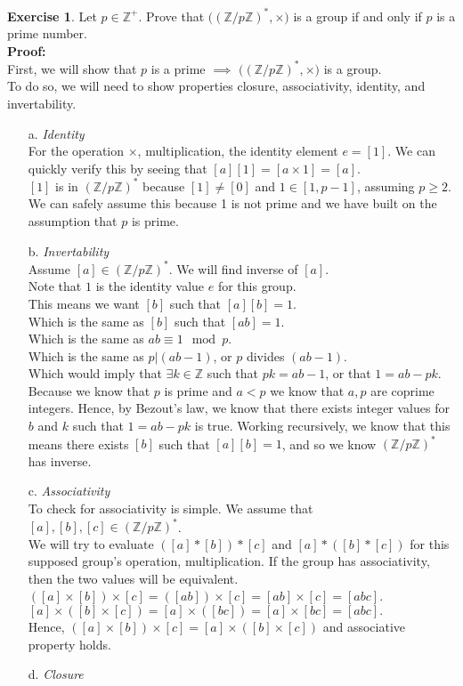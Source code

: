 \documentclass[12pt]{article}
\providecommand{\x}{\times}
\theoremstyle{definition}
\newtheorem{exercise}[theorem]{Exercise}
\newcommand{\Z}{\mathbb{Z}}
\newcommand{\V}{\vspace{0.3cm}\\}
\newcommand{\pro}{\V \textbf{Proof:} \V}
\begin{document}
\begin{exercise} Let $p \in \Z^+.$ Prove that $\big((\Z/p\Z)^*, \x \big)$ is a group if and only if $p$ is a prime number. 
\pro First, we will show that $p$ is a prime $\implies$ $\big((\Z/p\Z)^*, \x \big)$ is a group. \\
To do so, we will need to show properties closure, associativity, identity, and invertability. 
\begin{enumerate}
\item [a.] \textit{Identity} \\
For the operation $\x$, multiplication, the identity element $e = [1]$. We can quickly verify this by seeing that $[a][1] = [a \x 1] = [a]$. \V
$[1]$ is in $(\Z/p\Z)^*$ because $[1] \neq [0]$ and $1 \in [1, p-1]$, assuming $p \geq 2$. We can safely assume this because 1 is not prime and we have built on the assumption that $p$ is prime.  
\item[b. ] \textit{Invertability} \\
Assume $[a] \in (\Z/p\Z)^*$. We will find inverse of $[a]$. \V
Note that $1$ is the identity value $e$ for this group.\\
This means we want $[b]$ such that $[a][b] = 1$.\\
Which is the same as $[b]$ such that $[ab] = 1$.\\
Which is the same as $ab \equiv 1 \mod{p}$.\\
Which is the same as $p | (ab-1)$, or $p$ divides $(ab-1)$. \\
Which would imply that $\exists k\in \Z$ such that $pk = ab-1$, or that $1 = ab - pk$.\V
Because we know that $p$ is prime and $a<p$ we know that $a,p$ are coprime integers. Hence, by Bezout's law, we know that there exists integer values for $b$ and $k$ such that $1 = ab - pk$ is true. Working recursively, we know that this means there exists $[b]$ such that $[a][b] = 1$, and so we know $(\Z/p\Z)^*$ has inverse. 
\item[c.] \textit{Associativity} \\ 
To check for associativity is simple. We assume that $[a],[b],[c] \in (\Z/p\Z)^*$. \\
We will try to evaluate $([a]*[b])*[c]$ and $[a]*([b]*[c])$ for this supposed group's operation, multiplication. If the group has associativity, then the two values will be equivalent. \V
$([a]\x[b])\x[c] = ([ab])\x[c] = [ab]\x[c] = [abc]$.\V
$[a]\x([b]\x[c]) = [a] \x ([bc]) = [a] \x [bc] = [abc].$ \V
Hence, $([a]\x[b])\x[c] = [a]\x([b]\x[c])$ and associative property holds. 
\item[d.] \textit{Closure} \\

\end{enumerate}
\end{exercise}
\end{document}
